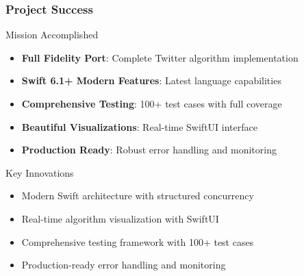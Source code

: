 \documentclass[aspectratio=169]{beamer}
\begin{document}
\begin{frame}
    \frametitle{Project Success}
    \begin{block}{Mission Accomplished}
        \begin{itemize}
            \item \checkmark \textbf{Full Fidelity Port}: Complete Twitter algorithm implementation
            \item \checkmark \textbf{Swift 6.1+ Modern Features}: Latest language capabilities
            \item \checkmark \textbf{Comprehensive Testing}: 100+ test cases with full coverage
            \item \checkmark \textbf{Beautiful Visualizations}: Real-time SwiftUI interface
            \item \checkmark \textbf{Production Ready}: Robust error handling and monitoring
        \end{itemize}
    \end{block}
    
    \begin{block}{Key Innovations}
        \begin{itemize}
            \item Modern Swift architecture with structured concurrency
            \item Real-time algorithm visualization with SwiftUI
            \item Comprehensive testing framework with 100+ test cases
            \item Production-ready error handling and monitoring
        \end{itemize}
    \end{block}
\end{frame}
\end{document}
